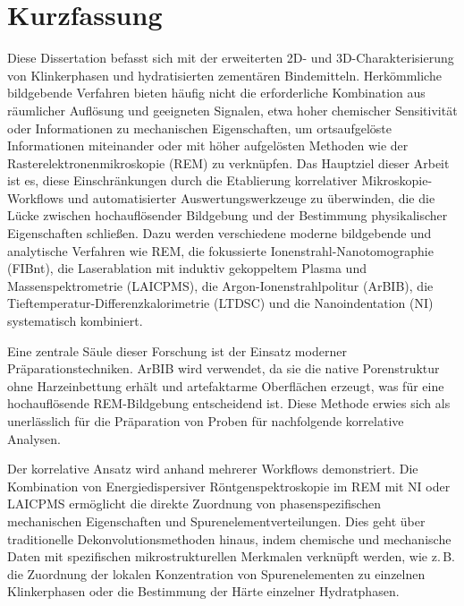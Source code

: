 \chapter*{Kurzfassung}

Diese Dissertation befasst sich mit der erweiterten 2D- und 3D-Charakterisierung von Klinkerphasen und hydratisierten zementären Bindemitteln.
Herkömmliche bildgebende Verfahren bieten häufig nicht die erforderliche Kombination aus räumlicher Auflösung und geeigneten Signalen, etwa hoher chemischer Sensitivität oder Informationen zu mechanischen Eigenschaften, um ortsaufgelöste Informationen miteinander oder mit höher aufgelösten Methoden wie der Rasterelektronenmikroskopie (REM) zu verknüpfen.
Das Hauptziel dieser Arbeit ist es, diese Einschränkungen durch die Etablierung korrelativer Mikroskopie-Workflows und automatisierter Auswertungswerkzeuge zu überwinden, die die Lücke zwischen hochauflösender Bildgebung und der Bestimmung physikalischer Eigenschaften schließen.
Dazu werden verschiedene moderne bildgebende und analytische Verfahren wie REM, die fokussierte Ionenstrahl-Nano\-to\-mo\-gra\-phie (\acs*{FIBnt}), die Laserablation mit induktiv gekoppeltem Plasma und Massenspektrometrie (\acs*{LAICPMS}), die Argon-Ionenstrahlpolitur (\acs*{ArBIB}), die Tieftemperatur-Differenzkalorimetrie (\acs*{LTDSC}) und die Nanoindentation (\acs*{NI}) systematisch kombiniert.

Eine zentrale Säule dieser Forschung ist der Einsatz moderner Präparationstechniken.
\acs*{ArBIB} wird verwendet, da sie die native Porenstruktur ohne Harzeinbettung erhält und artefaktarme Oberflächen erzeugt, was für eine hochauflösende REM-Bildgebung entscheidend ist.
Diese Methode erwies sich als unerlässlich für die Präparation von Proben für nachfolgende korrelative Analysen.

Der korrelative Ansatz wird anhand mehrerer Workflows demonstriert.
Die Kombination von Energiedispersiver Röntgenspektroskopie im REM mit \acs*{NI} oder \acs*{LAICPMS} ermöglicht die direkte Zuordnung von phasenspezifischen mechanischen Eigenschaften und Spurenelementverteilungen.
Dies geht über traditionelle Dekonvolutionsmethoden hinaus, indem chemische und mechanische Daten mit spezifischen mikrostrukturellen Merkmalen verknüpft werden, wie z.\,B. die Zuordnung der lokalen Konzentration von Spurenelementen zu einzelnen Klinkerphasen oder die Bestimmung der Härte einzelner Hydratphasen.

